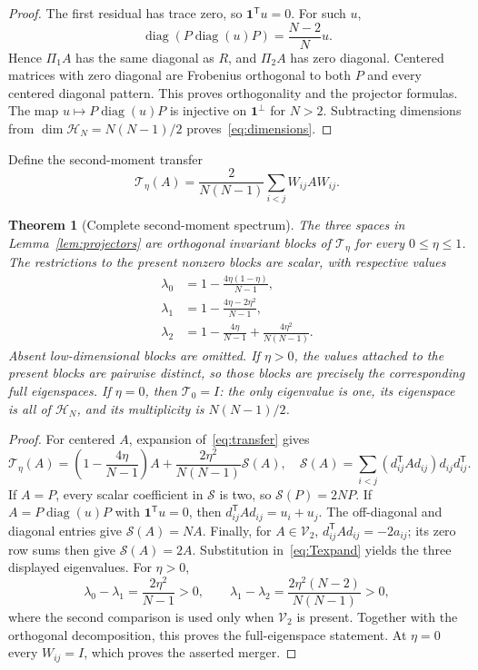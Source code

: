 \documentclass[10pt]{article}
\newtheorem{theorem}{Theorem}
\newcommand{\one}{\mathbf 1}
\newcommand{\cT}{\mathcal T}
\newcommand{\cS}{\mathcal S}
\begin{document}
\begin{proof}
The first residual has trace zero, so $\one^{\mathsf T}u=0$.  For such $u$,
\[
 \operatorname{diag}(P\operatorname{diag}(u)P)
 =\frac{N-2}{N}u.
\]
Hence $\Pi_1A$ has the same diagonal as $R$, and $\Pi_2A$ has zero
diagonal.  Centered matrices with zero diagonal are Frobenius orthogonal to
both $P$ and every centered diagonal pattern.  This proves orthogonality and
the projector formulas.  The map $u\mapsto P\operatorname{diag}(u)P$ is
injective on $\one^\perp$ for $N>2$.  Subtracting dimensions from
$\dim\mathscr H_N=N(N-1)/2$ proves~\eqref{eq:dimensions}.
\end{proof}

Define the second-moment transfer
\begin{equation}\label{eq:transfer}
 \cT_\eta(A)=\frac{2}{N(N-1)}\sum_{i<j}W_{ij}AW_{ij}.
\end{equation}

\begin{theorem}[Complete second-moment spectrum]\label{thm:spectrum}
The three spaces in Lemma~\ref{lem:projectors} are orthogonal invariant
blocks of $\cT_\eta$ for every $0\leq\eta\leq1$.  The restrictions to the
present nonzero blocks are scalar, with respective values
\begin{align}
 \lambda_0&=1-\frac{4\eta(1-\eta)}{N-1},\label{eq:lambda0}\\
 \lambda_1&=1-\frac{4\eta-2\eta^2}{N-1},\label{eq:lambda1}\\
 \lambda_2&=1-\frac{4\eta}{N-1}
              +\frac{4\eta^2}{N(N-1)}.\label{eq:lambda2}
\end{align}
Absent low-dimensional blocks are omitted.  If $\eta>0$, the values attached
to the present blocks are pairwise distinct, so those blocks are precisely
the corresponding full eigenspaces.  If $\eta=0$, then $\cT_0=I$: the only
eigenvalue is one, its eigenspace is all of $\mathscr H_N$, and its
multiplicity is $N(N-1)/2$.
\end{theorem}

\begin{proof}
For centered $A$, expansion of~\eqref{eq:transfer} gives
\begin{equation}\label{eq:Texpand}
 \cT_\eta(A)=(1-\frac{4\eta}{N-1})A
 +\frac{2\eta^2}{N(N-1)}\cS(A),
 \quad
 \cS(A)=\sum_{i<j}(d_{ij}^{\mathsf T}Ad_{ij})d_{ij}d_{ij}^{\mathsf T}.
\end{equation}
If $A=P$, every scalar coefficient in $\cS$ is two, so
$\cS(P)=2NP$.  If $A=P\operatorname{diag}(u)P$ with
$\one^{\mathsf T}u=0$, then
$d_{ij}^{\mathsf T}Ad_{ij}=u_i+u_j$.  The off-diagonal and diagonal entries
give $\cS(A)=NA$.  Finally, for $A\in\mathscr V_2$,
$d_{ij}^{\mathsf T}Ad_{ij}=-2a_{ij}$; its zero row sums then give
$\cS(A)=2A$.  Substitution in~\eqref{eq:Texpand} yields the three displayed
eigenvalues.
For $\eta>0$,
\[
 \lambda_0-\lambda_1=\frac{2\eta^2}{N-1}>0,
 \qquad
 \lambda_1-\lambda_2=\frac{2\eta^2(N-2)}{N(N-1)}>0,
\]
where the second comparison is used only when $\mathscr V_2$ is present.
Together with the orthogonal decomposition, this proves the full-eigenspace
statement.  At $\eta=0$ every $W_{ij}=I$, which proves the asserted merger.
\end{proof}
\end{document}
